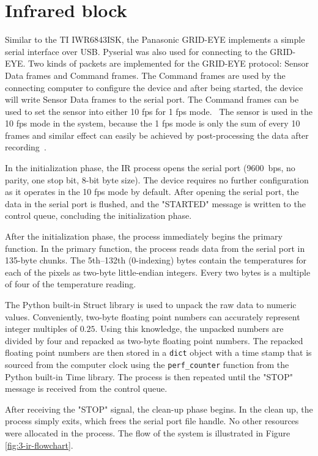 \section{Infrared block}
\label{sec:3-ir}
Similar to the TI IWR6843ISK, the Panasonic GRID-EYE implements a simple serial interface over USB.
Pyserial was also used for connecting to the GRID-EYE.
Two kinds of packets are implemented for the GRID-EYE protocol: Sensor Data frames and Command frames.
The Command frames are used by the connecting computer to configure the device and after being started,
the device will write Sensor Data frames to the serial port.
The Command frames can be used to set the sensor into either 10 \gls{fps} for 1 \gls{fps} mode.~\cite{grid-eye-protocol}
The sensor is used in the 10 \gls{fps} mode in the system, because the 1 \gls{fps} mode is only the sum of every 10 frames
and similar effect can easily be achieved by post-processing the data after recording~\cite{grid-eye-manual}.

In the initialization phase, the IR process opens the serial port (9600~bps, no parity, one stop bit, 8-bit byte size).
The device requires no further configuration as it operates in the 10 \gls{fps} mode by default.
After opening the serial port, the data in the serial port is flushed,
and the "STARTED" message is written to the control queue,
concluding the initialization phase.

After the initialization phase, the process immediately begins the primary function.
In the primary function, the process reads data from the serial port in 135-byte chunks.
The 5th--132th (0-indexing) bytes contain the temperatures for each of the pixels as two-byte little-endian integers.
Every two bytes is a multiple of four of the temperature reading.

The Python built-in Struct library is used to unpack the raw data to numeric values.
Conveniently, two-byte floating point numbers can accurately represent integer multiples of $0.25$.
Using this knowledge, the unpacked numbers are divided by four and repacked as two-byte floating point numbers.
The repacked floating point numbers are then stored in a \texttt{dict} object with a time stamp that is sourced 
from the computer clock using the \texttt{perf\_counter} function from the Python built-in Time library.
The process is then repeated until the "STOP" message is received from the control queue.

After receiving the "STOP" signal, the clean-up phase begins.
In the clean up, the process simply exits,
which frees the serial port file handle.
No other resources were allocated in the process.
The flow of the system is illustrated in Figure \ref{fig:3-ir-flowchart}.

